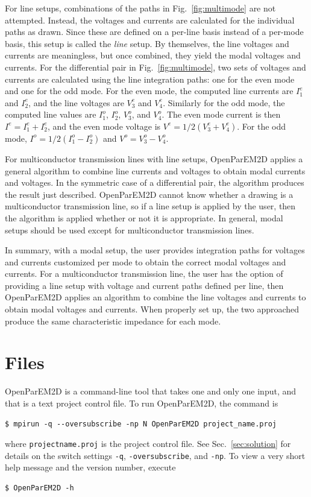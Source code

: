 \documentclass[titlepage]{article}
\renewcommand\_{\textunderscore\linebreak[1]}
\begin{document}
For line setups, combinations of the paths in Fig.~\ref{fig:multimode} are not attempted.  Instead, the voltages and currents are calculated for the individual paths as drawn.  Since these are defined on a per-line basis instead of a per-mode basis, this setup is called the \textit{line} setup.  By themselves, the line voltages and currents are meaningless, but once combined, they yield the modal voltages and currents.  For the differential pair in Fig.~\ref{fig:multimode}, two sets of voltages and currents are calculated using the line integration paths: one for the even mode and one for the odd mode.  For the even mode, the computed line currents are $I_1^e$ and $I_2^e$, and the line voltages are $V_3^e$ and $V_4^e$.  Similarly for the odd mode, the computed line values are $I_1^o$, $I_2^o$, $V_3^o$, and $V_4^o$.  The even mode current is then $I^e=I_1^e+I_2^e$, and the even mode voltage is $V^e=1/2(V_3^e+V_4^e)$.  For the odd mode, $I^o=1/2(I_1^o-I_2^o)$ and $V^o=V_3^o-V_4^o$.

For multiconductor transmission lines with line setups, OpenParEM2D applies a general algorithm to combine line currents and voltages to obtain modal currents and voltages.  In the symmetric case of a differential pair, the algorithm produces the result just described.  OpenParEM2D cannot know whether a drawing is a multiconductor transmission line, so if a line setup is applied by the user, then the algorithm is applied whether or not it is appropriate.  In general, modal setups should be used except for multiconductor transmission lines.

In summary, with a modal setup, the user provides integration paths for voltages and currents customized per mode to obtain the correct modal voltages and currents.  For a multiconductor transmission line, the user has the option of providing a line setup with voltage and current paths defined per line, then OpenParEM2D applies an algorithm to combine the line voltages and currents to obtain modal voltages and currents.  When properly set up, the two approached produce the same characteristic impedance for each mode.

\section{Files}
\label{sec:files}

OpenParEM2D is a command-line tool that takes one and only one input, and that is a text project control file.  To run OpenParEM2D, the command is
\begin{Verbatim}[fontsize=\small]
   $ mpirun -q --oversubscribe -np N OpenParEM2D project_name.proj
\end{Verbatim}
where \texttt{project\_name.proj} is the project control file.  See Sec.~\ref{sec:solution} for details on the switch settings \texttt{-q}, \texttt{-oversubscribe}, and \texttt{-np}. To view a very short help message and the version number, execute
\begin{Verbatim}[fontsize=\small]
   $ OpenParEM2D -h
\end{Verbatim}
\end{document}
